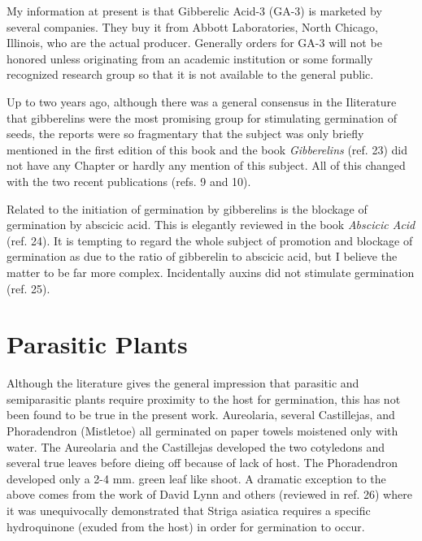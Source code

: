 My information at present is that Gibberelic Acid-3 (GA-3) is marketed by
several companies. They buy it from Abbott Laboratories, North Chicago, Illinois, who
are the actual producer. Generally orders for GA-3 will not be honored unless
originating from an academic institution or some formally recognized research group
so that it is not available to the general public.

Up to two years ago, although there was a general consensus in the Iliterature
that gibberelins were the most promising group for stimulating germination of seeds,
the reports were so fragmentary that the subject was only briefly mentioned in the first
edition of this book and the book \textit{Gibberelins} (ref. 23) did not have any Chapter or
hardly any mention of this subject. All of this changed with the two recent publications
(refs. 9 and 10).

Related to the initiation of germination by gibberelins is the blockage of
germination by abscicic acid. This is elegantly reviewed in the book \textit{Abscicic Acid}
(ref. 24). It is tempting to regard the whole subject of promotion and blockage of
germination as due to the ratio of gibberelin to abscicic acid, but I believe the matter to
be far more complex. Incidentally auxins did not stimulate germination (ref. 25).

\section{Parasitic Plants}

Although the literature gives the general impression that
parasitic and semiparasitic plants require proximity to the host for germination, this has
not been found to be true in the present work. Aureolaria, several Castillejas, and
Phoradendron (Mistletoe) all germinated on paper towels moistened only with water.
The Aureolaria and the Castillejas developed the two cotyledons and several true
leaves before dieing off because of lack of host. The Phoradendron developed only a
2-4 mm. green leaf like shoot. A dramatic exception to the above comes from the work
of David Lynn and others (reviewed in ref. 26) where it was unequivocally
demonstrated that Striga asiatica requires a specific hydroquinone (exuded from the
host) in order for germination to occur.

